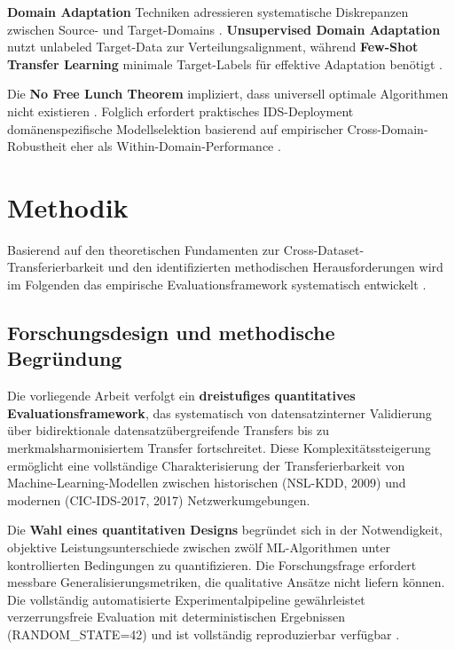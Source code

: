 \documentclass[11pt,a4paper]{article}
\begin{document}
    \textbf{Domain Adaptation} Techniken adressieren systematische Diskrepanzen zwischen Source- und Target-Domains \parencite{Goodfellow2016}. \textbf{Unsupervised Domain Adaptation} nutzt unlabeled Target-Data zur Verteilungsalignment, während \textbf{Few-Shot Transfer Learning} minimale Target-Labels für effektive Adaptation benötigt \parencite{Hastie2009}.

    Die \textbf{No Free Lunch Theorem} impliziert, dass universell optimale Algorithmen nicht existieren \parencite{Bishop2006}. Folglich erfordert praktisches IDS-Deployment domänenspezifische Modellselektion basierend auf empirischer Cross-Domain-Robustheit eher als Within-Domain-Performance \parencite{Mourouzis2021}.

    \clearpage

    \section{Methodik}

    Basierend auf den theoretischen Fundamenten zur Cross-Dataset-Transferierbarkeit und den identifizierten methodischen Herausforderungen wird im Folgenden das empirische Evaluationsframework systematisch entwickelt \parencite{Weirauch2025}.

    \subsection{Forschungsdesign und methodische Begründung}

    Die vorliegende Arbeit verfolgt ein \textbf{dreistufiges quantitatives Evaluationsframework}, das systematisch von datensatzinterner Validierung über bidirektionale datensatzübergreifende Transfers bis zu merkmalsharmonisiertem Transfer fortschreitet. Diese Komplexitätssteigerung ermöglicht eine vollständige Charakterisierung der Transferierbarkeit von Machine-Learning-Modellen zwischen historischen (NSL-KDD, 2009) und modernen (CIC-IDS-2017, 2017) Netzwerkumgebungen.

    Die \textbf{Wahl eines quantitativen Designs} begründet sich in der Notwendigkeit, objektive Leistungsunterschiede zwischen zwölf ML-Algorithmen unter kontrollierten Bedingungen zu quantifizieren. Die Forschungsfrage erfordert messbare Generalisierungsmetriken, die qualitative Ansätze nicht liefern können. Die vollständig automatisierte Experimentalpipeline gewährleistet verzerrungsfreie Evaluation mit deterministischen Ergebnissen (RANDOM\_STATE=42) und ist vollständig reproduzierbar verfügbar \parencite{Weirauch2025}.
\end{document}
